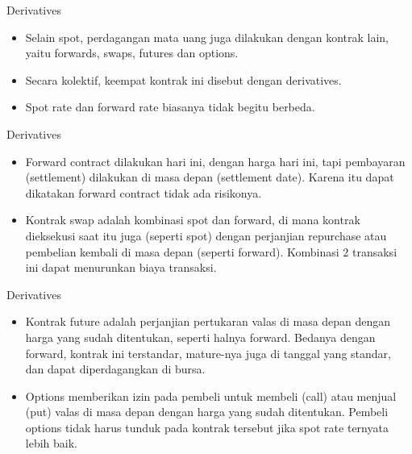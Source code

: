 \documentclass[
  ignorenonframetext,
]{beamer}
\begin{document}
\begin{frame}{Derivatives}
\label{derivatives}
\begin{itemize}
\item
  Selain spot, perdagangan mata uang juga dilakukan dengan kontrak lain,
  yaitu forwards, swaps, futures dan options.
\item
  Secara kolektif, keempat kontrak ini disebut dengan derivatives.
\item
  Spot rate dan forward rate biasanya tidak begitu berbeda.
\end{itemize}
\end{frame}

\begin{frame}{Derivatives}
\label{derivatives-1}
\begin{itemize}
\item
  Forward contract dilakukan hari ini, dengan harga hari ini, tapi
  pembayaran (settlement) dilakukan di masa depan (settlement date).
  Karena itu dapat dikatakan forward contract tidak ada risikonya.
\item
  Kontrak swap adalah kombinasi spot dan forward, di mana kontrak
  dieksekusi saat itu juga (seperti spot) dengan perjanjian repurchase
  atau pembelian kembali di masa depan (seperti forward). Kombinasi 2
  transaksi ini dapat menurunkan biaya transaksi.
\end{itemize}
\end{frame}

\begin{frame}{Derivatives}
\label{derivatives-2}
\begin{itemize}
\item
  Kontrak future adalah perjanjian pertukaran valas di masa depan dengan
  harga yang sudah ditentukan, seperti halnya forward. Bedanya dengan
  forward, kontrak ini terstandar, mature-nya juga di tanggal yang
  standar, dan dapat diperdagangkan di bursa.
\item
  Options memberikan izin pada pembeli untuk membeli (call) atau menjual
  (put) valas di masa depan dengan harga yang sudah ditentukan. Pembeli
  options tidak harus tunduk pada kontrak tersebut jika spot rate
  ternyata lebih baik.
\end{itemize}
\end{frame}
\end{document}
